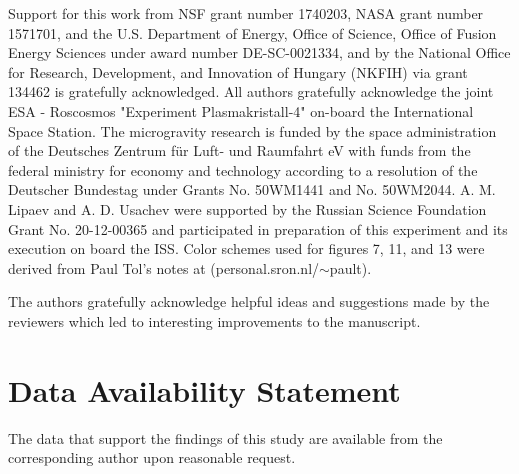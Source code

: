 \documentclass[aip,amsmath,amssymb,graphicx,floatfix,reprint]{revtex4-1}
\begin{document}
\begin{acknowledgments}
Support for this work from NSF grant number 1740203, NASA grant number 1571701, and the U.S. Department of Energy, Office of Science, Office of Fusion Energy Sciences under award number DE-SC-0021334, and by the National Office for Research, Development, and Innovation of Hungary (NKFIH) via grant 134462 is gratefully acknowledged.  All authors gratefully acknowledge the joint ESA - Roscosmos "Experiment Plasmakristall-4" on-board the International Space Station. The microgravity research is funded by the space administration of the Deutsches Zentrum f\"{u}r Luft- und Raumfahrt eV with funds from the federal ministry for economy and technology according to a resolution of the Deutscher Bundestag under Grants No. 50WM1441 and No. 50WM2044.  A. M. Lipaev and A. D. Usachev were supported by the Russian Science Foundation Grant No. 20-12-00365 and participated in preparation of this experiment and its execution on board the ISS.  Color schemes used for figures 7, 11, and 13 were derived from Paul Tol's notes at (personal.sron.nl/$\sim$pault).

The authors gratefully acknowledge helpful ideas and suggestions made by the reviewers which led to interesting improvements to the manuscript.
\end{acknowledgments}

\section*{Data Availability Statement}
The data that support the findings of this study are available from the corresponding author upon reasonable request.



\end{document}
